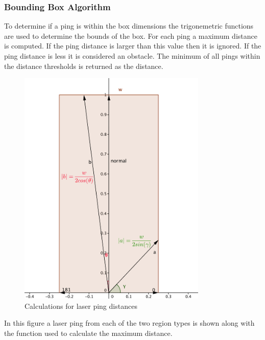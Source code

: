 \subsubsection{Bounding Box Algorithm}
To determine if a ping is within the box dimensions the trigonemetric
functions are used to determine the bounds of the box.  For each ping
a maximum distance is computed.  If the ping distance is larger than this
value then it is ignored. If the ping distance is less it is
considered an obstacle.  The minimum of all pings within the distance
thresholds is returned as the distance.

\FloatBarrier
\begin{figure}[h]
  \centering
  \includegraphics[height=4.5in]{Look_Ahead_Bounding_Box.png}
  \caption{Calculations for laser ping distances}
\end{figure}
\FloatBarrier

In this figure a laser ping from each of the two region types is shown
along with the function used to calculate the maximum distance.

